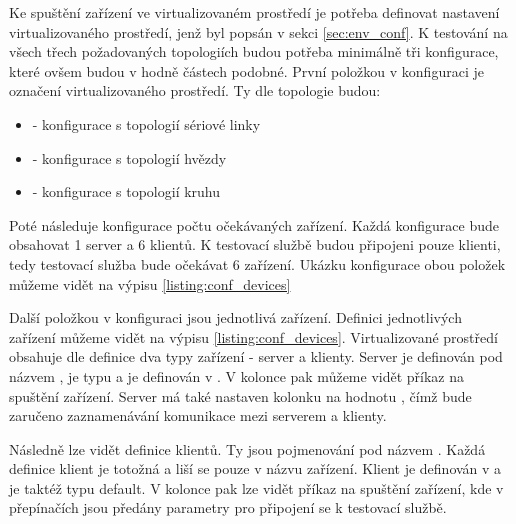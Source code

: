 Ke spuštění zařízení ve virtualizovaném prostředí je potřeba definovat nastavení virtualizovaného prostředí, jenž byl popsán v sekci \ref{sec:env_conf}. K testování na všech třech požadovaných topologiích budou potřeba minimálně tři konfigurace, které ovšem budou v hodně částech podobné. První položkou v konfiguraci je označení virtualizovaného prostředí. Ty dle topologie budou:

\begin{itemize}
    \item {} - konfigurace s topologií sériové linky
    \item {} - konfigurace s topologií hvězdy
    \item {} - konfigurace s topologií kruhu
\end{itemize}

Poté následuje konfigurace počtu očekávaných zařízení. Každá konfigurace bude obsahovat 1 server a 6 klientů. K testovací službě budou připojeni pouze klienti, tedy testovací služba bude očekávat 6 zařízení. Ukázku konfigurace obou položek můžeme vidět na výpisu \ref{listing:conf_devices}

Další položkou v konfiguraci jsou jednotlivá zařízení. Definici jednotlivých zařízení můžeme vidět na výpisu \ref{listing:conf_devices}. Virtualizované prostředí obsahuje dle definice dva typy zařízení - server a klienty. Server je definován pod názvem , je typu  a je definován v . V kolonce  pak můžeme vidět příkaz na spuštění zařízení. Server má také nastaven kolonku  na hodnotu , čímž bude zaručeno zaznamenávání komunikace mezi serverem a klienty.

Následně lze vidět definice klientů. Ty jsou pojmenování pod názvem . Každá definice klient je totožná a liší se pouze v názvu zařízení. Klient je definován v  a je taktéž typu default. V kolonce  pak lze vidět příkaz na spuštění zařízení, kde v přepínačích jsou předány parametry pro připojení se k testovací službě.


